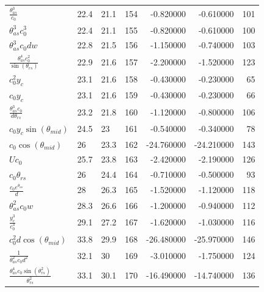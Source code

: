 \begin{tabularx}{\textwidth}{lllrrrr}
$ \displaystyle\frac{\theta_{as}^{3}}{c_{0}} $  &  22.4  &  21.1  &  154  &  -0.820000  &  -0.610000  &  101  \\ 
$ \theta_{as}^{3} c_{0}^{3} $  &  22.4  &  21.1  &  155  &  -0.820000  &  -0.610000  &  100  \\ 
$ \theta_{as}^{3} c_{0} d w $  &  22.8  &  21.5  &  156  &  -1.150000  &  -0.740000  &  103  \\ 
$ \displaystyle\frac{\theta_{as}^{4} c_{0}^{2}}{\sin{\left(\theta_{rs} \right)}} $  &  22.9  &  21.6  &  157  &  -2.200000  &  -1.520000  &  123  \\ 
$ c_{0}^{2} y_c $  &  23.1  &  21.6  &  158  &  -0.430000  &  -0.230000  &  65  \\ 
$ c_{0} y_c $  &  23.1  &  21.6  &  159  &  -0.430000  &  -0.230000  &  66  \\ 
$ \displaystyle\frac{\theta_{as}^{3} c_{0}}{d \theta_{rs}} $  &  23.2  &  21.8  &  160  &  -1.120000  &  -0.800000  &  106  \\ 
$ c_{0} y_c \sin{\left(\theta_{mid} \right)} $  &  24.5  &  23\phantom{.0}  &  161  &  -0.540000  &  -0.340000  &  78  \\ 
$ c_{0} \cos{\left(\theta_{mid} \right)} $  &  26\phantom{.0}  &  23.3  &  162  &  -24.760000  &  -24.210000  &  143  \\ 
$ U c_{0} $  &  25.7  &  23.8  &  163  &  -2.420000  &  -2.190000  &  126  \\ 
$ c_{0} \theta_{rs} $  &  26\phantom{.0}  &  24.4  &  164  &  -0.710000  &  -0.500000  &  93  \\ 
$ \displaystyle\frac{c_{0} e^{\theta_{as}}}{d} $  &  28\phantom{.0}  &  26.3  &  165  &  -1.520000  &  -1.120000  &  118  \\ 
$ \theta_{as}^{2} c_{0} w $  &  28.3  &  26.6  &  166  &  -1.200000  &  -0.940000  &  112  \\ 
$ \displaystyle\frac{y_c^{3}}{c_{0}^{3}} $  &  29.1  &  27.2  &  167  &  -1.620000  &  -1.030000  &  116  \\ 
$ c_{0}^{2} d \cos{\left(\theta_{mid} \right)} $  &  33.8  &  29.9  &  168  &  -26.480000  &  -25.970000  &  146  \\ 
$ \displaystyle\frac{1}{\theta_{as}^{2} c_{0} d^{2}} $  &  32.1  &  30\phantom{.0}  &  169  &  -3.010000  &  -1.750000  &  124  \\ 
$ \displaystyle\frac{\theta_{as}^{4} c_{0} \sin{\left(\theta_{rs}^{2} \right)}}{\theta_{rs}^{2}} $  &  33.1  &  30.1  &  170  &  -16.490000  &  -14.740000  &  136  \\ 

\end{tabularx}
